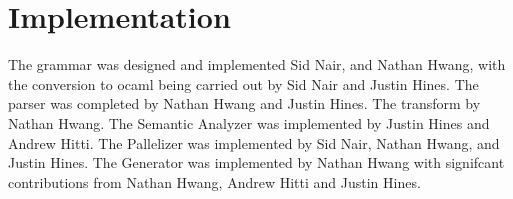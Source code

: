 \section{Implementation}
The grammar was designed and implemented Sid Nair, and Nathan Hwang,
with the conversion to ocaml being carried out by Sid Nair and Justin
Hines.  The parser was completed by Nathan Hwang and Justin Hines.
The transform by Nathan Hwang.  The Semantic Analyzer was implemented
by Justin Hines and Andrew Hitti.  The Pallelizer was implemented by
Sid Nair, Nathan Hwang, and Justin Hines. The Generator was
implemented by Nathan Hwang with signifcant contributions from Nathan
Hwang, Andrew Hitti and Justin Hines.
